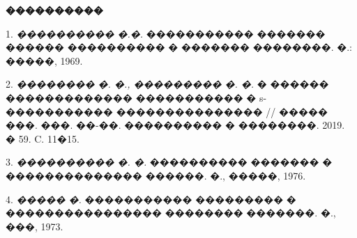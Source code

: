 \documentclass[a5paper, 12pt, openbib]{report}
\begin{document}
\smallskip \centerline {\bf ����������} \nopagebreak

1. {\it ���������� �.�.} ����������� ������� ������ ���������� � ������� ��������. �.: �����, 1969.

2. {\it �������� �. �., ��������� �. �.}  � ������ ������������� ����������� � s-����������� ��������������� // ����� ���. ���. ��-��. ���������� � ��������. 2019. � 59. C. 11�15.

3. {\it ���������� �. �.} ���������� ������� � �������������� ������. �., �����, 1976.

4. {\it ����� �.} ����������� ��������� � ���������������� �������� �������. �., ���, 1973.
\end{document}
